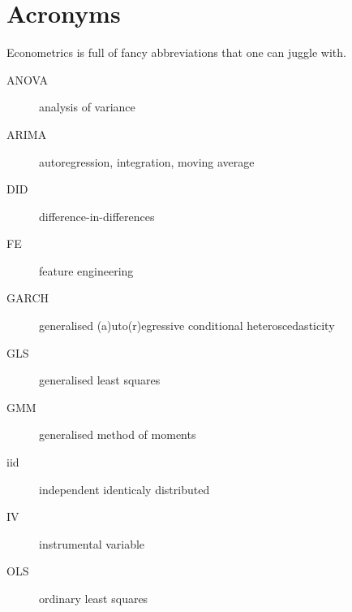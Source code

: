 \documentclass[letterpaper,10pt,english]{sphinxmanual}
\begin{document}
\chapter{Acronyms}
\label{\detokenize{acronyms:acronyms}}\label{\detokenize{acronyms::doc}}
Econometrics is full of fancy abbreviations that one can juggle with.
\begin{description}
\item[{ANOVA\label{\detokenize{acronyms:term-anova}}}] \leavevmode
analysis of variance

\item[{ARIMA\label{\detokenize{acronyms:term-arima}}}] \leavevmode
autoregression, integration, moving average

\item[{DID\label{\detokenize{acronyms:term-did}}}] \leavevmode
difference-in-differences

\item[{FE\label{\detokenize{acronyms:term-fe}}}] \leavevmode
feature engineering

\item[{GARCH\label{\detokenize{acronyms:term-garch}}}] \leavevmode
generalised (a)uto(r)egressive conditional heteroscedasticity

\item[{GLS\label{\detokenize{acronyms:term-gls}}}] \leavevmode
generalised least squares

\item[{GMM\label{\detokenize{acronyms:term-gmm}}}] \leavevmode
generalised method of moments

\item[{iid\label{\detokenize{acronyms:term-iid}}}] \leavevmode
independent identicaly distributed

\item[{IV\label{\detokenize{acronyms:term-iv}}}] \leavevmode
instrumental variable

\item[{OLS\label{\detokenize{acronyms:term-ols}}}] \leavevmode
ordinary least squares


\end{description}
\end{document}
